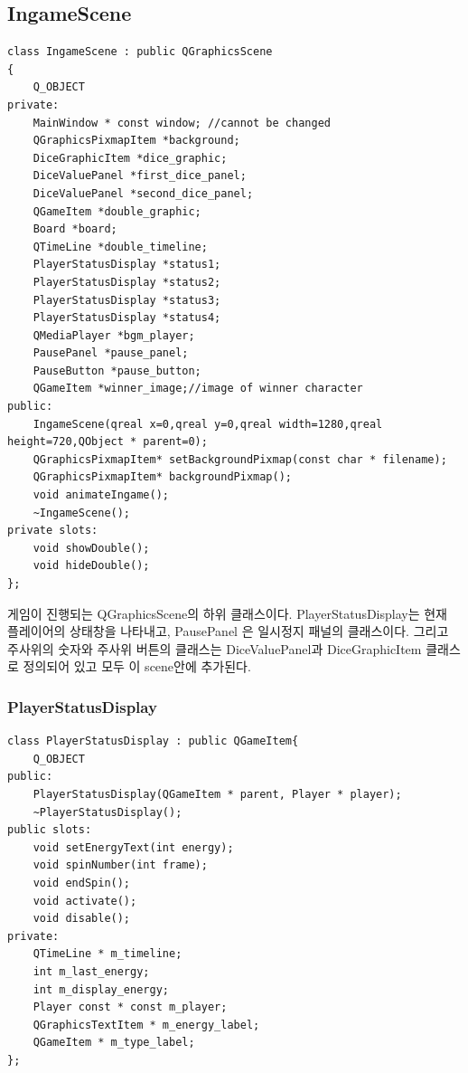 \documentclass[10pt,oneside,a4paper,titlepage]{article}
\begin{document}
\subsection{IngameScene}
\begin{lstlisting}[frame=single,caption=
{IngameScene header},label=code:FD,captionpos=b,framexleftmargin=10pt]
class IngameScene : public QGraphicsScene
{
    Q_OBJECT
private:
    MainWindow * const window; //cannot be changed
    QGraphicsPixmapItem *background;
    DiceGraphicItem *dice_graphic;
    DiceValuePanel *first_dice_panel;
    DiceValuePanel *second_dice_panel;
    QGameItem *double_graphic;
    Board *board;
    QTimeLine *double_timeline;
    PlayerStatusDisplay *status1;
    PlayerStatusDisplay *status2;
    PlayerStatusDisplay *status3;
    PlayerStatusDisplay *status4;
    QMediaPlayer *bgm_player;
    PausePanel *pause_panel;
    PauseButton *pause_button;
    QGameItem *winner_image;//image of winner character
public:
    IngameScene(qreal x=0,qreal y=0,qreal width=1280,qreal height=720,QObject * parent=0);
    QGraphicsPixmapItem* setBackgroundPixmap(const char * filename);
    QGraphicsPixmapItem* backgroundPixmap();
    void animateIngame();
    ~IngameScene();
private slots:
    void showDouble();
    void hideDouble();
};

\end{lstlisting}

게임이 진행되는 QGraphicsScene의 하위 클래스이다. PlayerStatusDisplay는 현재 플레이어의 상태창을 나타내고, PausePanel 은 일시정지 패널의 클래스이다. 그리고 주사위의 숫자와 주사위 버튼의 클래스는 DiceValuePanel과 DiceGraphicItem 클래스로 정의되어 있고 모두 이 scene안에 추가된다.

\subsubsection{PlayerStatusDisplay}

\begin{lstlisting}[frame=single,caption=
{PlayerStatusDisplay header},label=code:FD,captionpos=b,framexleftmargin=10pt]
class PlayerStatusDisplay : public QGameItem{
    Q_OBJECT
public:
    PlayerStatusDisplay(QGameItem * parent, Player * player);
    ~PlayerStatusDisplay();
public slots:
    void setEnergyText(int energy);
    void spinNumber(int frame);
    void endSpin();
    void activate();
    void disable();
private:
    QTimeLine * m_timeline;
    int m_last_energy;
    int m_display_energy;
    Player const * const m_player;
    QGraphicsTextItem * m_energy_label;
    QGameItem * m_type_label;
};
\end{lstlisting}
\end{document}
